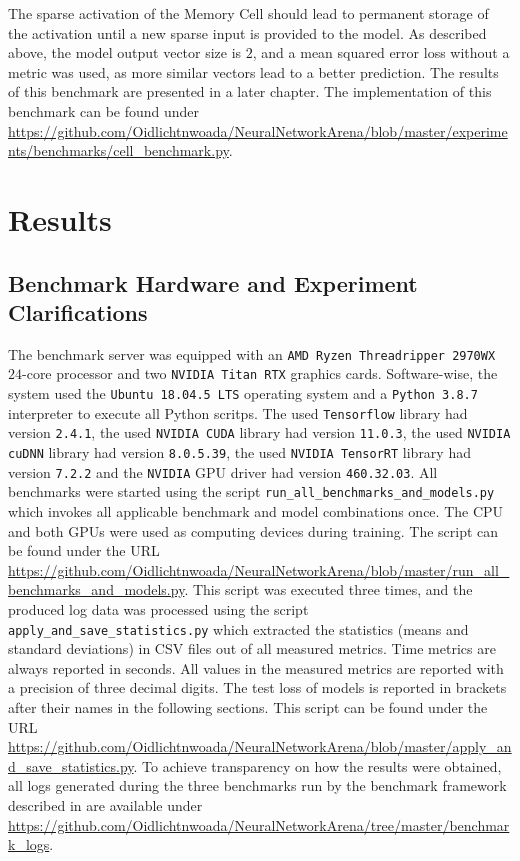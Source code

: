 \documentclass[draft,final]{vutinfth} %
\begin{document}
    The sparse activation of the Memory Cell should lead to permanent storage of the activation until a new sparse input is provided to the model.
    As described above, the model output vector size is $2$, and a mean squared error loss without a metric was used, as more similar vectors lead to a better prediction.
    The results of this benchmark are presented in a later chapter.
    The implementation of this benchmark can be found under \url{https://github.com/Oidlichtnwoada/NeuralNetworkArena/blob/master/experiments/benchmarks/cell_benchmark.py}.


    \chapter{Results} \label{chapter_results}


    \section{Benchmark Hardware and Experiment Clarifications}
    The benchmark server was equipped with an \texttt{AMD Ryzen Threadripper 2970WX} $24$-core processor and two \texttt{NVIDIA Titan RTX} graphics cards.
    Software-wise, the system used the \texttt{Ubuntu 18.04.5 LTS} operating system and a \texttt{Python 3.8.7} \cite{Python3} interpreter to execute all Python scritps.
    The used \texttt{Tensorflow} \cite{Tensorflow} library had version \texttt{2.4.1}, the used \texttt{NVIDIA CUDA} library had version \texttt{11.0.3}, the used \texttt{NVIDIA cuDNN} library \cite{cuDNN} had version \texttt{8.0.5.39}, the used \texttt{NVIDIA TensorRT} library had version \texttt{7.2.2} and the \texttt{NVIDIA} GPU driver had version \texttt{460.32.03}.
    All benchmarks were started using the script \texttt{run\_all\_benchmarks\_and\_models.py} which invokes all applicable benchmark and model combinations once.
    The CPU and both GPUs were used as computing devices during training.
    The script can be found under the URL \url{https://github.com/Oidlichtnwoada/NeuralNetworkArena/blob/master/run_all_benchmarks_and_models.py}.
    This script was executed three times, and the produced log data was processed using the script \texttt{apply\_and\_save\_statistics.py} which extracted the statistics (means and standard deviations) in CSV files out of all measured metrics.
    Time metrics are always reported in seconds.
    All values in the measured metrics are reported with a precision of three decimal digits.
    The test loss of models is reported in brackets after their names in the following sections.
    This script can be found under the URL \url{https://github.com/Oidlichtnwoada/NeuralNetworkArena/blob/master/apply_and_save_statistics.py}.
    To achieve transparency on how the results were obtained, all logs generated during the three benchmarks run by the benchmark framework described in  are available under \url{https://github.com/Oidlichtnwoada/NeuralNetworkArena/tree/master/benchmark_logs}.
\end{document}
